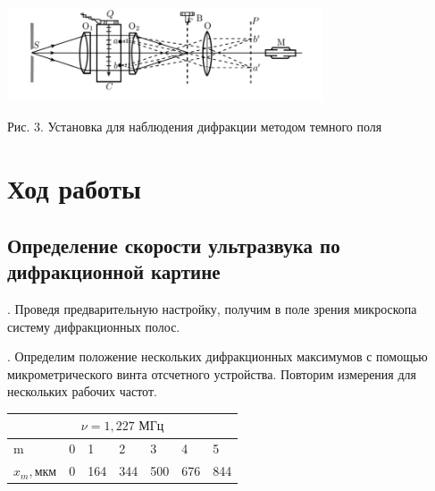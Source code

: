 \documentclass[a4paper,12pt]{article} %
\begin{document}
	\begin{center}

	\includegraphics[width=0.7\textwidth]{3.png}
	
	Рис. 3. Установка для наблюдения дифракции методом темного поля
	\label{shema2}
\end{center}

\section{Ход работы}

\subsection{Определение скорости ультразвука по дифракционной картине}

. Проведя предварительную настройку, получим в поле зрения микроскопа систему дифракционных полос.

\medskip

. Определим положение нескольких дифракционных максимумов с помощью микрометрического винта отсчетного устройства. Повторим измерения для нескольких рабочих частот.

\begin{table}[!h]
\begin{tabular}{|lllllll|}
\hline
\multicolumn{7}{|c|}{$\nu   = 1,227 \text{ МГц}$}                                                                                                                                  \\ \hline
\multicolumn{1}{|l|}{m}                 & \multicolumn{1}{l|}{0} & \multicolumn{1}{l|}{1}   & \multicolumn{1}{l|}{2}   & \multicolumn{1}{l|}{3}   & \multicolumn{1}{l|}{4}   & 5   \\ \hline
\multicolumn{1}{|l|}{$x_m, \text{мкм}$} & \multicolumn{1}{l|}{0} & \multicolumn{1}{l|}{164} & \multicolumn{1}{l|}{344} & \multicolumn{1}{l|}{500} & \multicolumn{1}{l|}{676} & 844 \\ \hline
\end{tabular}
\end{table}
\end{document}

